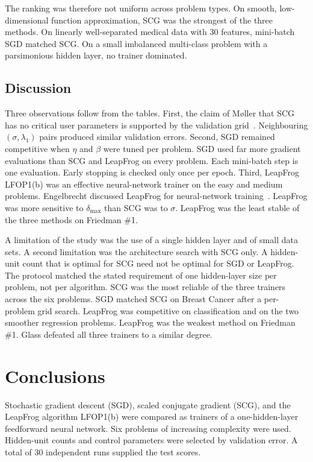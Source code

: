 \documentclass[conference,10pt]{IEEEtran}
\begin{document}
The ranking was therefore not uniform across problem types.
On smooth, low-dimensional function approximation, SCG was the strongest of the three methods.
On linearly well-separated medical data with 30 features, mini-batch SGD matched SCG.
On a small imbalanced multi-class problem with a parsimonious hidden layer, no trainer dominated.

\subsection{Discussion}
Three observations follow from the tables.
First, the claim of M{\o}ller that SCG has no critical user parameters is supported by the validation grid~\cite{moller1993}.
Neighbouring $(\sigma,\lambda_{1})$ pairs produced similar validation errors.
Second, SGD remained competitive when $\eta$ and $\beta$ were tuned per problem.
SGD used far more gradient evaluations than SCG and LeapFrog on every problem.
Each mini-batch step is one evaluation.
Early stopping is checked only once per epoch.
Third, LeapFrog LFOP1(b) was an effective neural-network trainer on the easy and medium problems.
Engelbrecht discussed LeapFrog for neural-network training~\cite{engelbrecht2007}.
LeapFrog was more sensitive to $\delta_{\max}$ than SCG was to $\sigma$.
LeapFrog was the least stable of the three methods on Friedman \#1.

A limitation of the study was the use of a single hidden layer and of small data sets.
A second limitation was the architecture search with SCG only.
A hidden-unit count that is optimal for SCG need not be optimal for SGD or LeapFrog.
The protocol matched the stated requirement of one hidden-layer size per problem, not per algorithm.
SCG was the most reliable of the three trainers across the six problems.
SGD matched SCG on Breast Cancer after a per-problem grid search.
LeapFrog was competitive on classification and on the two smoother regression problems.
LeapFrog was the weakest method on Friedman \#1.
Glass defeated all three trainers to a similar degree.


\section{Conclusions}
\label{sec:conclusions}
Stochastic gradient descent (SGD), scaled conjugate gradient (SCG), and the LeapFrog algorithm LFOP1(b) were compared as trainers of a one-hidden-layer feedforward neural network.
Six problems of increasing complexity were used.
Hidden-unit counts and control parameters were selected by validation error.
A total of 30 independent runs supplied the test scores.
\end{document}
